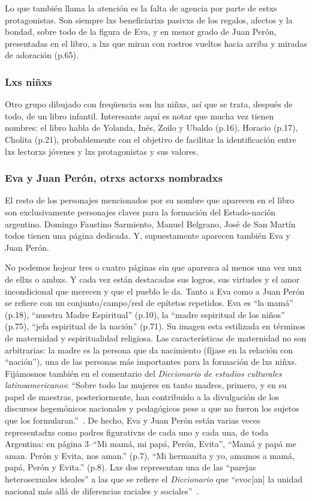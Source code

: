 Lo que también llama la atención es la falta de agencia por parte de estxs protagonistas.
Son siempre lxs beneficiarixs pasivxs de los regalos, afectos y la bondad, sobre todo de la figura de Eva, y en menor grado de Juan Perón, presentadas en el libro, a lxs que miran con rostros vueltos hacia arriba y miradas de adoración (p.65).

\subsubsection{Lxs niñxs}
Otro grupo dibujado con freqüencia son lxs niñxs, así que se trata, después de todo, de un libro infantil.
Interesante aquí es notar que mucha vez tienen nombres: el libro habla de Yolanda, Inés, Zoilo y Ubaldo (p.16), Horacio (p.17), Cholita (p.21),
probablemente con el objetivo de facilitar la identificación entre lxs lectorxs jóvenes y lxs protagonistas y sus valores.


\subsubsection{Eva y Juan Perón, otrxs actorxs nombradxs}
El resto de los personajes mencionados por su nombre que aparecen en el libro son exclusivamente personajes claves para la formación del Estado-nación argentino.
Domingo Faustino Sarmiento, Manuel Belgrano, José de San Martín todos tienen una página dedicada.
Y, supuestamente aparecen también Eva y Juan Perón.

No podemos hojear tres o cuatro páginas sin que aparezca al menos una vez unx de ellxs o ambxs.
Y cada vez están destacadas sus logros, sus virtudes y el amor incondicional que merecen y que el pueblo le da.
Tanto a Eva como a Juan Perón se refiere con un conjunto/campo/red de epítetos repetidos.
Eva es ``la mamá'' (p.18), ``nuestra Madre Espiritual'' (p.10), la ``madre espiritual de los niños'' (p.75), ``jefa espiritual de la nación'' (p.71).
Su imagen esta estilizada en términos de maternidad y espiritualidad religiosa.
Las características de maternidad no son arbitrarias: la madre es la persona que da nacimiento (fíjase en la relación con ``nación''), una de las personas más importantes para la formación de lxs niñxs.
Fijámosnos también en el comentario del \textit{Diccionario de estudios culturales latinoamericanos}: ``Sobre todo las mujeres en tanto madres, primero, y en su papel de maestras, posteriormente, han contribuido a la divulgación de los discursos hegemónicos nacionales y pedagógicos pese a que no fueron los sujetos que los formularan.''~\autocite[190-191]{SzIr2009}.
De hecho, Eva y Juan Perón están varias veces representadxs como padres figurativxs de cada uno y cada una, de toda Argentina:
en página 3--``Mi mamá, mi papá, Perón, Evita'', ``Mamá y papá me aman. Perón y Evita, nos aman.'' (p.7), ``Mi hermanita y yo, amamos a mamá, papá, Perón y Evita.'' (p.8).
Lxs dos representan una de las ``parejas heterosexuales ideales'' a las que se refiere el \textit{Diccionario} que ``evoc[an] la unidad nacional más allá de diferencias raciales y sociales''~\autocite[192-193]{SzIr2009}.

